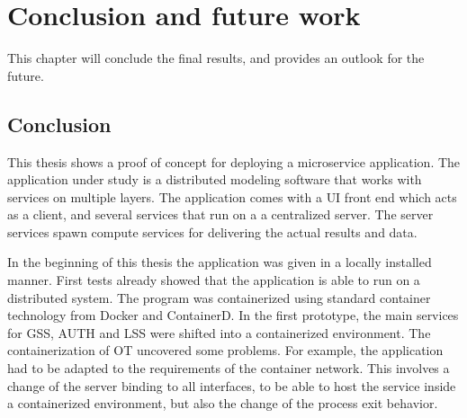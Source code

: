 
\chapter{Conclusion and future work} %

\label{chap:conclusion} %


This chapter will conclude the final results, and provides an outlook for the future.


\section{Conclusion}
This thesis shows a proof of concept for deploying a microservice application. 
The application under study is a distributed modeling software that works with services on multiple layers.
The application comes with a \ac{UI} front end which acts as a client, and  several services that run on a a centralized server. The server services spawn compute services for delivering the actual results and data.

In the beginning of this thesis the application was given in a locally installed manner. First tests already showed that the application is able to run on a distributed system. 
The program was containerized using standard container technology from Docker and ContainerD. In the first prototype, the main services for \ac{GSS}, \ac{AUTH} and \ac{LSS} were shifted into a containerized environment.  
The containerization of \ac{OT} uncovered some problems. For example, the application had to be adapted to the requirements of the container network. This involves a change of the server binding to all interfaces, to be able to host the service inside a containerized environment, but also the change of the process exit behavior.

